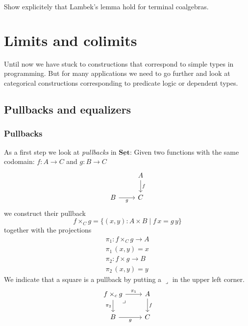 \documentclass{article}
\newcommand{\cat}[1]{\underline{\mathbf{#1}}}
\begin{document}
\begin{Exercise}
  Show explicitely that Lambek's lemma hold for terminal coalgebras.
\end{Exercise}

\newpage
\section{Limits and colimits}
\label{sec:limits-colimits}

Until now we have stuck to constructions that correspond to simple types in programming. But for many applications we need to go further and look at categorical constructions corresponding to predicate logic or dependent types.

\subsection{Pullbacks and equalizers}
\label{sec:pullbacks-equalizers}

\subsubsection*{Pullbacks}
\label{sec:pullbacks}

As a first step we look at \emph{pullbacks} in $\cat{Set}$: Given two functions with the same codomain: $f : A \to C$ and $g : B \to C$ 
\[\begin{tikzcd}
& A \arrow[d,"f"] \\
B \arrow[r,"g" below] &C 
\end{tikzcd}\]
we construct their pullback 
\[ f \times_C g = \{ (x,y) : A \times B \mid f\,x = g\,y \} \]
together with the projections
\begin{align*}
\pi_1 : f \times_C g \to A \\
\pi_1\,(x,y) = x \\
\pi_2 : f \times g \to B \\
\pi_2\,(x,y) = y 
\end{align*}
We indicate that a square is a pullback by putting a $\lrcorner$ in the upper left corner.
\[\begin{tikzcd}
f \times_c g \arrow[r,"\pi_1"] \arrow[d,"\pi_2" left] \arrow[dr, phantom, "\lrcorner", very near start]
    & A \arrow[d,"f"] \\
B \arrow[r,"g" below] &C 
\end{tikzcd}\]
\end{document}
